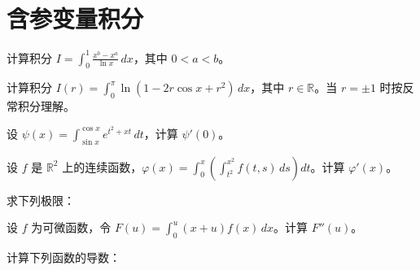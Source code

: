 \renewcommand{\thesection}{\arabic{section}}\renewcommand{\theHsection}{chapter.\arabic{section}}\setcounter{section}{17}\section{含参变量积分}
\noindent\begin{minipage}{\textwidth}
计算积分 $\displaystyle I=\int_0^1\frac{x^b-x^a}{\ln x}\,dx$，其中 $0<a<b$。
\end{minipage}\par\vfill
\noindent\begin{minipage}{\textwidth}
计算积分 $\displaystyle I(r)=\int_0^\pi\ln(1-2r\cos x+r^2)\,dx$，其中 $r\in\mathbb R$。当 $r=\pm1$ 时按反常积分理解。
\end{minipage}\par\vfill
\noindent\begin{minipage}{\textwidth}
设 $\displaystyle\psi(x)=\int_{\sin x}^{\cos x}e^{t^2+xt}\,dt$，计算 $\psi'(0)$。
\end{minipage}\par\vfill
\newpage
\noindent\begin{minipage}{\textwidth}
设 $f$ 是 $\mathbb R^2$ 上的连续函数，$\displaystyle\varphi(x)=\int_0^x\left(\int_{t^2}^{x^2}f(t,s)\,ds\right)dt$。计算 $\varphi'(x)$。
\end{minipage}\par\vfill
\noindent\begin{minipage}{\textwidth}
求下列极限：
\end{minipage}\par\vfill
\noindent\begin{minipage}{\textwidth}
设 $f$ 为可微函数，令 $\displaystyle F(u)=\int_0^u(x+u)f(x)\,dx$。计算 $F''(u)$。
\end{minipage}\par\vfill
\newpage
\noindent\begin{minipage}{\textwidth}
计算下列函数的导数：
\end{minipage}\par\vfill
